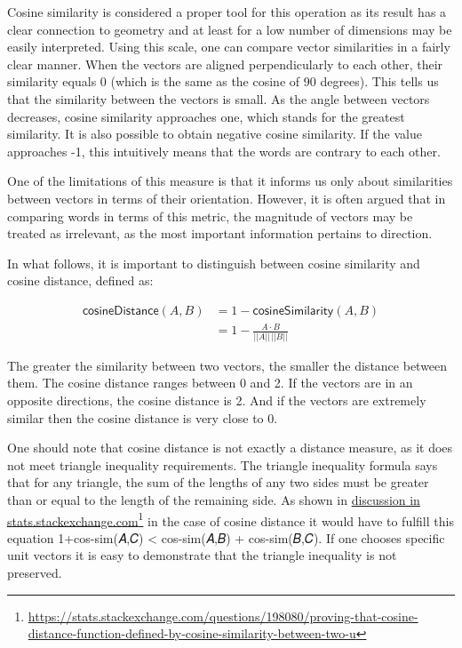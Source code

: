 \documentclass[12pt,]{book}
\begin{document}
Cosine similarity is considered a proper tool for this operation as its
result has a clear connection to geometry and at least for a low number
of dimensions may be easily interpreted. Using this scale, one can
compare vector similarities in a fairly clear manner. When the vectors
are aligned perpendicularly to each other, their similarity equals 0
(which is the same as the cosine of 90 degrees). This tells us that the
similarity between the vectors is small. As the angle between vectors
decreases, cosine similarity approaches one, which stands for the
greatest similarity. It is also possible to obtain negative cosine
similarity. If the value approaches -1, this intuitively means that the
words are contrary to each other.

One of the limitations of this measure is that it informs us only about
similarities between vectors in terms of their orientation. However, it
is often argued that in comparing words in terms of this metric, the
magnitude of vectors may be treated as irrelevant, as the most important
information pertains to direction.

In what follows, it is important to distinguish between cosine
similarity and cosine distance, defined as:

\begin{align} \tag{Sim}
\mathsf{cosineDistance}(A,B) &  = 1 - \mathsf{cosineSimilarity}(A,B)\\
 &  = 1 - \frac{A \cdot B}{\vert \vert A \vert \vert \,\vert \vert B \vert \vert} \nonumber
\end{align}

The greater the similarity between two vectors, the smaller the distance
between them. The cosine distance ranges between 0 and 2. If the vectors
are in an opposite directions, the cosine distance is 2. And if the
vectors are extremely similar then the cosine distance is very close to
0.

One should note that cosine distance is not exactly a distance measure,
as it does not meet triangle inequality requirements. The triangle
inequality formula says that for any triangle, the sum of the lengths of
any two sides must be greater than or equal to the length of the
remaining side. As shown in
\href{https://stats.stackexchange.com/questions/198080/proving-that-cosine-distance-function-defined-by-cosine-similarity-between-two-u}{discussion
in stats.stackexchange.com}\footnote{\url{https://stats.stackexchange.com/questions/198080/proving-that-cosine-distance-function-defined-by-cosine-similarity-between-two-u}}
in the case of cosine distance it would have to fulfill this equation
1+cos-sim(𝐴,𝐶) \textless{} cos-sim(𝐴,𝐵) + cos-sim(𝐵,𝐶). If one chooses
specific unit vectors it is easy to demonstrate that the triangle
inequality is not preserved.
\end{document}

